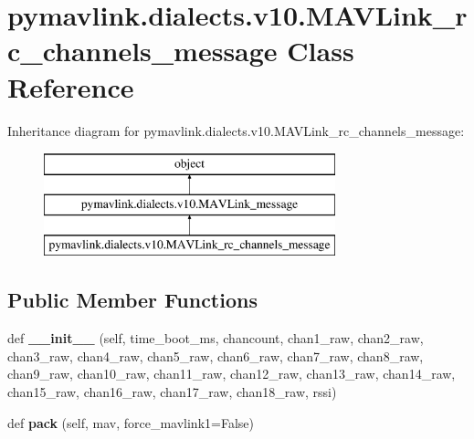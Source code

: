 \hypertarget{classpymavlink_1_1dialects_1_1v10_1_1MAVLink__rc__channels__message}{}\section{pymavlink.\+dialects.\+v10.\+M\+A\+V\+Link\+\_\+rc\+\_\+channels\+\_\+message Class Reference}
\label{classpymavlink_1_1dialects_1_1v10_1_1MAVLink__rc__channels__message}
Inheritance diagram for pymavlink.\+dialects.\+v10.\+M\+A\+V\+Link\+\_\+rc\+\_\+channels\+\_\+message\+:\begin{figure}[H]
\begin{center}
\leavevmode
\includegraphics[height=3.000000cm]{classpymavlink_1_1dialects_1_1v10_1_1MAVLink__rc__channels__message}
\end{center}
\end{figure}
\subsection*{Public Member Functions}
\begin{DoxyCompactItemize}
\item 
\mbox{\label{classpymavlink_1_1dialects_1_1v10_1_1MAVLink__rc__channels__message_a21ac1ecb0339595461dc53d1eeb9d111}} 
def {\bfseries \+\_\+\+\_\+init\+\_\+\+\_\+} (self, time\+\_\+boot\+\_\+ms, chancount, chan1\+\_\+raw, chan2\+\_\+raw, chan3\+\_\+raw, chan4\+\_\+raw, chan5\+\_\+raw, chan6\+\_\+raw, chan7\+\_\+raw, chan8\+\_\+raw, chan9\+\_\+raw, chan10\+\_\+raw, chan11\+\_\+raw, chan12\+\_\+raw, chan13\+\_\+raw, chan14\+\_\+raw, chan15\+\_\+raw, chan16\+\_\+raw, chan17\+\_\+raw, chan18\+\_\+raw, rssi)
\item 
\mbox{\label{classpymavlink_1_1dialects_1_1v10_1_1MAVLink__rc__channels__message_a4d5eb055889410e7e69d744360bca168}} 
def {\bfseries pack} (self, mav, force\+\_\+mavlink1=False)
\end{DoxyCompactItemize}
